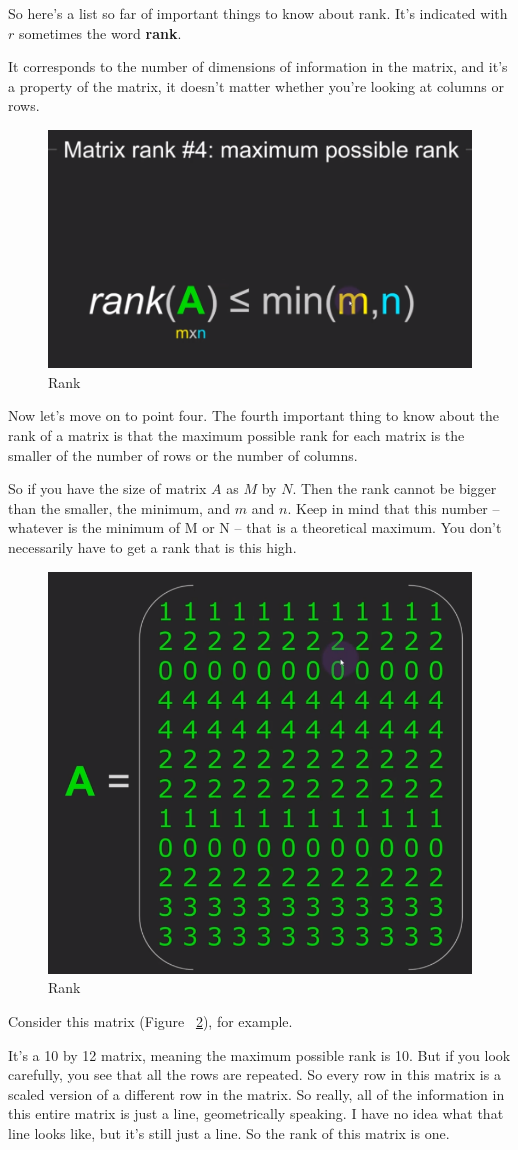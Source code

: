 \documentclass[fleqn,10pt]{olplainarticle}
\theoremstyle{definition}
\theoremstyle{remark}
\begin{document}
So here's a list so far of important things to know about rank. It's indicated with $r$ sometimes the word \textbf{rank}.

It corresponds to the number of dimensions of information in the matrix, and it's a property of the matrix, it doesn't matter whether you're looking at columns or rows.

\begin{figure}[ht]
	\centering
	\includegraphics[width=0.3\linewidth]{images/rank-06.png}
	\caption{Rank}
	\label{fig:rank_06}
\end{figure}

Now let's move on to point four. The fourth important thing to know about the rank of a matrix is that the maximum possible rank for each matrix is the smaller of the number of rows or the number of columns.

So if you have the size of matrix $A$ as $M$ by $N$. Then the rank cannot be bigger than the smaller, the minimum, and $m$ and $n$. Keep in mind that this number -- whatever is the minimum of M or N -- that is a theoretical maximum. You don't necessarily have to get a rank that is this high.

\begin{figure}[ht]
	\centering
	\includegraphics[width=0.25\linewidth]{images/rank-07.png}
	\caption{Rank}
	\label{fig:rank_07}
\end{figure}

Consider this matrix (Figure ~\ref{fig:rank_07}), for example.

It's a 10 by 12 matrix, meaning the maximum possible rank is 10. But if you look carefully, you see that all the rows are repeated. So every row in this matrix is a scaled version of a different row in the matrix. So really, all of the information in this entire matrix is just a line, geometrically speaking. I have no idea what that line looks like, but it's still just a line. So the rank of this matrix is one.
\end{document}
